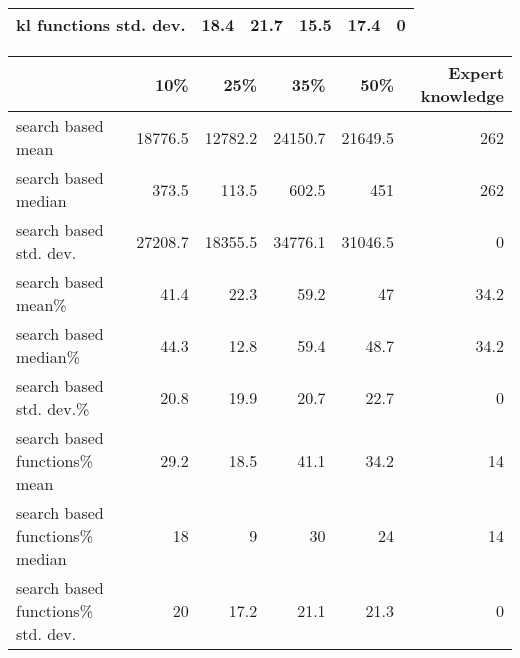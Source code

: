 \begin{tabular}{lrrrrr}
 kl functions std. dev. &    18.4 &    21.7 &    15.5 &    17.4 &                  0 \\
\hline
\end{tabular}\begin{tabular}{lrrrrr}
\hline
                                   &     10\% &     25\% &     35\% &     50\% &   Expert knowledge \\
\hline
 search based mean                 & 18776.5 & 12782.2 & 24150.7 & 21649.5 &              262   \\
 search based median               &   373.5 &   113.5 &   602.5 &   451   &              262   \\
 search based std. dev.            & 27208.7 & 18355.5 & 34776.1 & 31046.5 &                0   \\
 search based mean\%                &    41.4 &    22.3 &    59.2 &    47   &               34.2 \\
 search based median\%              &    44.3 &    12.8 &    59.4 &    48.7 &               34.2 \\
 search based std. dev.\%           &    20.8 &    19.9 &    20.7 &    22.7 &                0   \\
 search based functions\% mean      &    29.2 &    18.5 &    41.1 &    34.2 &               14   \\
 search based functions\% median    &    18   &     9   &    30   &    24   &               14   \\
 search based functions\% std. dev. &    20   &    17.2 &    21.1 &    21.3 &                0   \\
\hline
\end{tabular}
